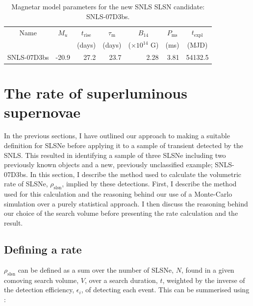 \begin{table}
\begin{center}
\caption{Magnetar model parameters for the new SNLS SLSN candidate: SNLS-07D3bs.}
\label{tab:07d3bsParams}
\begin{tabular}{|l|r|r|r|r|r|r|}
\hline
  \multicolumn{1}{|c|}{Name} &
  \multicolumn{1}{c|}{$M_u$} &
  \multicolumn{1}{c|}{$t_\mathrm{rise}$} &
  \multicolumn{1}{c|}{$\tau_\mathrm{m}$} &
  \multicolumn{1}{c|}{$B_{14}$} &
  \multicolumn{1}{c|}{$P_{\mathrm{ms}}$} &
  \multicolumn{1}{c|}{$t_\mathrm{expl}$} \\ & &
  \multicolumn{1}{c|}{(days)} &
  \multicolumn{1}{c|}{(days)} &
  \multicolumn{1}{c|}{($\times10^{14}$ G)} &
  \multicolumn{1}{c|}{(ms)} &
  \multicolumn{1}{c|}{(MJD)} \\
\hline
SNLS-07D3bs & -20.9 &  27.2 & 23.7 & 2.28 & 3.81 & 54132.5\\
\hline
\end{tabular}
\end{center}
\end{table}

\section{The rate of superluminous supernovae}
\label{sec:MC}
In the previous sections, I have outlined our approach to making a suitable definition for SLSNe before applying it to a sample of transient detected by the SNLS. This resulted in identifying a sample of three SLSNe including two previously known objects and a new, previously unclassified example; SNLS-07D3bs. In this section, I describe the method used to calculate the volumetric rate of SLSNe, $\rho_{\mathrm{slsn}}$, implied by these detections. First, I describe the method used for this calculation and the reasoning behind our use of a Monte-Carlo simulation over a purely statistical approach. I then discuss the reasoning behind our choice of the search volume before presenting the rate calculation and the result.

\subsection{Defining a rate}
\label{sec:method}
$\rho_{\mathrm{slsn}}$ can be defined as a sum over the number of SLSNe, $N$, found in a given comoving search volume, $V$, over a search duration, $t$, weighted by the inverse of the detection efficiency, $\epsilon_{i}$, of detecting each event. This can be summerised using :

